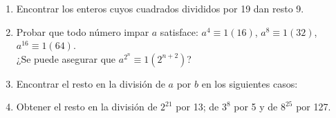 \documentclass[a4paper,12pt,twoside,spanish,reqno]{amsbook}
\numberwithin{equation}{section}
\begin{document}
\begin{enumerate}

\item Encontrar los enteros cuyos cuadrados divididos por 19 dan resto 9.


\item Probar que todo n\'umero impar $a$ satisface: $a^4 \equiv 1(16)$, $a^8 \equiv 1(32)$, $a^{16}\equiv 1(64)$.\\ ¿Se puede asegurar que $a^{2^n} \equiv 1 (2^{n+2})$?


\item Encontrar el resto en la divisi\'on de $a$ por $b$ en los siguientes casos:


\item Obtener el resto en la divisi\'on de $2^{21}$ por 13; de $3^8$ por 5 y de  $8^{25}$ por 127.



%


\end{enumerate}
\end{document}

